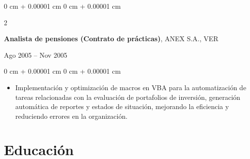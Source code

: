 \documentclass[10pt, letterpaper]{article}
\newenvironment{highlights}{
    \begin{itemize}[
        topsep=0.10 cm,
        parsep=0.10 cm,
        partopsep=0pt,
        itemsep=0pt,
        leftmargin=0 cm + 10pt
    ]
}{
    \end{itemize}
} %
\newenvironment{onecolentry}{
    \begin{adjustwidth}{
        0 cm + 0.00001 cm
    }{
        0 cm + 0.00001 cm
    }
}{
    \end{adjustwidth}
} %
\newenvironment{twocolentry}[2][]{
    \onecolentry
    \def\secondColumn{#2}
    \setcolumnwidth{\fill, 4.5 cm}
    \begin{paracol}{2}
}{
    \switchcolumn \raggedleft \secondColumn
    \end{paracol}
    \endonecolentry
} %
\begin{document}
        \begin{twocolentry}{Ago 2005 – Nov 2005}
            \textbf{Analista de pensiones (Contrato de prácticas)}, ANEX S.A., VER
        \end{twocolentry}

        \vspace{0.10 cm}
        \begin{onecolentry}
            \begin{highlights}
                \item Implementación y optimización de macros en VBA para la automatización de tareas relacionadas con la evaluación de portafolios de inversión, generación automática de reportes y estados de situación, mejorando la eficiencia y reduciendo errores en la organización.
            \end{highlights}
        \end{onecolentry}

        


    
    \section{Educación}
        
\end{document}
